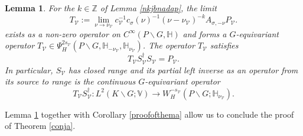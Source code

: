 \documentclass[a4paper,reqno]{amsart}
\numberwithin{equation}{section}
\def\Z{\mathbb{Z}}
\newtheorem{lemma}[thm]{Lemma}
\theoremstyle{definition}
\theoremstyle{remark}
\begin{document}
\begin{lemma}
\label{sourcedesc}
For the $k\in \Z$ of Lemma \ref{nkjbnadap}, the limit 
$$T_\mathcal{V}:=\lim_{\nu\to \nu_{\mathcal{V}}} c_\mathcal{V}^{-1}c_\sigma(\nu)^{-1}(\nu-\nu_{\mathcal{V}})^{-k}A_{\sigma,-\nu}P_\mathcal{V}.$$ 
exists as a non-zero operator on $C^\infty(P\backslash G,\mathbb{H})$ and forms a $G$-equivariant operator $T_\mathcal{V}\in \Psi^{2s_\mathcal{V}}_H(P\backslash G,\mathbb{H}_{-\nu_{\mathcal{V}}},\mathbb{H}_{\nu_{\mathcal{V}}})$. The operator $T_\mathcal{V}$ satisfies
$$T_\mathcal{V}S_{\mathcal{V}}^\dagger S_{\mathcal{V}}=P_\mathcal{V}.$$
In particular, $S_{\mathcal{V}}$ has closed range and its partial left inverse as an operator from its source to range is the continuous $G$-equivariant operator 
$$T_\mathcal{V}S_{\mathcal{V}}^\dagger:L^2(K\backslash G;\mathbb{V})\to W^{-s_\mathcal{V}}_H(P\backslash G; \mathbb{H}_{\nu_{\mathcal{V}}}).$$
\end{lemma}

Lemma \ref{sourcedesc} together with Corollary \ref{proofofthema} allow us to conclude the proof of Theorem \ref{conja}.
\end{document}
